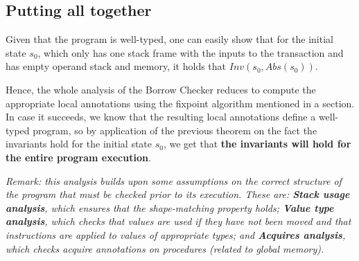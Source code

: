 \subsection{Putting all together}

Given that the program is well-typed, one can easily show that for the initial state $s_0$, which only has one stack frame with the inputs to the transaction and has empty operand stack and memory, it holds that $Inv(s_0, Abs(s_0))$.


Hence, the whole analysis of the Borrow Checker reduces to compute the appropriate local annotations using the fixpoint algorithm mentioned in a section. In case it succeeds, we know that the resulting local annotations define a well-typed program, so by application of the previous theorem on the fact the invariants hold for the initial state $s_0$, we get that \textbf{the invariants will hold for the entire program execution}.

\textit{Remark: this analysis builds upon some assumptions on the correct structure of the program that must be checked prior to its execution. These are: \textbf{Stack usage analysis}, which ensures that the shape-matching property holds; \textbf{Value type analysis}, which checks that values are used if they have not been moved and that instructions are applied to values of appropriate types; and \textbf{Acquires analysis}, which checks acquire annotations on procedures (related to global memory).}




